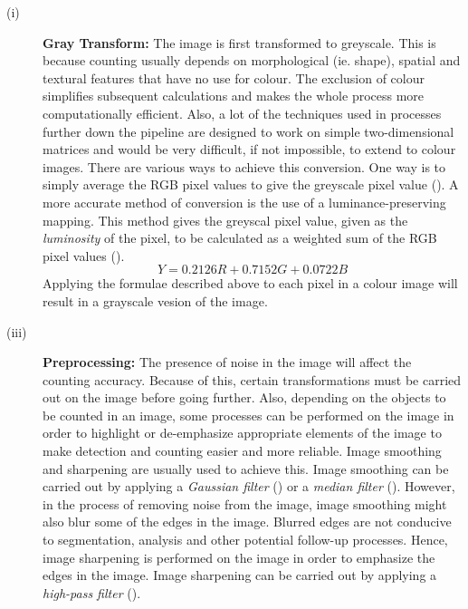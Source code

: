 \begin{description}
\item[(i)] \textbf{Gray Transform:} The image is first transformed to greyscale. This is because counting usually depends on morphological (ie. shape), spatial and textural features that have no use for colour. The exclusion of colour simplifies subsequent calculations and makes the whole process more computationally efficient. Also, a lot of the techniques used in processes further down the pipeline are designed to work on simple two-dimensional matrices and would be very difficult, if not impossible, to extend to colour images. There are various ways to achieve this conversion. One way is to simply average the RGB pixel values to give the greyscale pixel value (\cite{REF2}). A more accurate method of conversion is the use of a luminance-preserving mapping. This method gives the greyscal pixel value, given as the \textit{luminosity} of the pixel, to be calculated as a weighted sum of the RGB pixel values (\cite{REF3}).
\begin{equation}
Y = 0.2126R + 0.7152G + 0.0722B
\label{eqn:luminosity}
\end{equation}
Applying the formulae described above to each pixel in a colour image will result in a grayscale vesion of the image.\\ 

\item[(iii)] \textbf{Preprocessing:} The presence of noise in the image will affect the counting accuracy. Because of this, certain transformations must be carried out on the image before going further. Also, depending on the objects to be counted in an image, some processes can be performed on the image in order to highlight or de-emphasize appropriate elements of the image to make detection and counting easier and more reliable. Image smoothing and sharpening are usually used to achieve this. Image smoothing can be carried out by applying a \textit{Gaussian filter} (\cite{REF4}) or a \textit{median filter} (\cite{REF5}). However, in the process of removing noise from the image, image smoothing might also blur some of the edges in the image. Blurred edges are not conducive to segmentation, analysis and other potential follow-up processes. Hence, image sharpening is performed on the image in order to emphasize the edges in the image. Image sharpening can be carried out by applying a \textit{high-pass filter} (\cite{REF6}).\\


\end{description}
